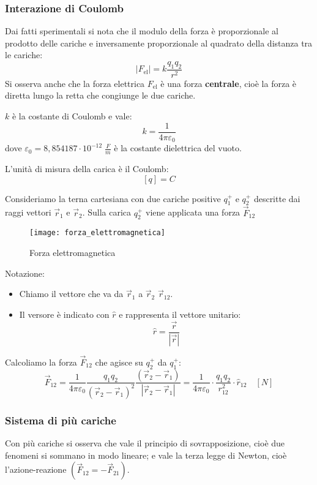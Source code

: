 \documentclass[a4paper]{article}
\begin{document}
\subsubsection{Interazione di Coulomb}
Dai fatti sperimentali si nota che il modulo della forza è proporzionale al prodotto
delle cariche e inversamente proporzionale al quadrato della distanza tra le cariche:
\[
  | F_{\text{el}} | = k \frac{q_1 q_2}{r^2}
\] 
Si osserva anche che la forza elettrica \( F_{\text{el}} \) è una forza \textbf{centrale},
cioè la forza è diretta lungo la retta che congiunge le due cariche.

\( k \) è la costante di Coulomb e vale:
\[
  k = \frac{1}{4 \pi \varepsilon_0}
\]
dove \( \varepsilon_0 = 8,854187 \cdot 10^{-12} \; \frac{F}{m} \) è la costante dielettrica del vuoto.

L'unità di misura della carica è il Coulomb:
\[
  [q] = C
\] 

\vspace{1em}
\noindent
Consideriamo la terna cartesiana con due cariche positive \( q^+_1 \) e \( q^+_2 \)
descritte dai raggi vettori \( \vec{r}_1 \) e \( \vec{r}_2 \). Sulla carica \( q^+_2 \) 
viene applicata una forza \( \vec{F}_{12} \) 
\begin{figure}[H]
  \centering
	\texttt{[image: forza\_elettromagnetica]}
  \caption{Forza elettromagnetica}
\end{figure}

\noindent
Notazione: 
\begin{itemize}
  \item 
    Chiamo il vettore che va da \( \vec{r}_1 \) a \( \vec{r}_2 \) \( \vec{r}_{12} \).

  \item 
    Il versore è indicato con \( \hat{r} \) e rappresenta il vettore unitario:
    \[
      \hat{r} = \frac{\vec{r}}{|\vec{r}|}
    \] 
\end{itemize}


\vspace{1em}
\noindent
Calcoliamo la forza \( \vec{F}_{12} \) che agisce su \( q^+_2 \) da \( q^+_1 \):
\[
  \vec{F}_{12} = \frac{1}{4 \pi \varepsilon_0} \frac{q_1 q_2}{\left( \vec{r}_{2}
    - \vec{r}_1 \right)^2} \frac{\left( \vec{r}_{2} - \vec{r}_1 \right)}{|\vec{r}_{2}
  - \vec{r}_1|} = 
  \frac{1}{4 \pi \varepsilon_0} \cdot \frac{q_1 q_2}{r_{12}^2} \cdot \hat{r}_{12} \quad [N]
\] 

\subsubsection{Sistema di più cariche}
Con più cariche si osserva che vale il principio di sovrapposizione, cioè due fenomeni
si sommano in modo lineare; e vale la terza legge di Newton, cioè l'azione-reazione
\( \left( \vec{F}_{12} = - \vec{F}_{21} \right)  \).
\end{document}
